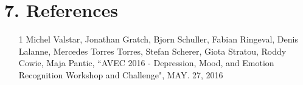 \documentclass{article}
\begin{document}
	\section{7.	References}
	\begin{itemize}
	\item
	[1] Michel Valstar, Jonathan Gratch, Bjorn Schuller, Fabian Ringeval, Denis Lalanne, Mercedes Torres Torres, Stefan Scherer, Giota Stratou, Roddy Cowie, Maja Pantic, ``AVEC 2016 - Depression, Mood, and Emotion Recognition Workshop and Challenge", MAY. 27, 2016 \\
	\end{itemize}
\end{document}
